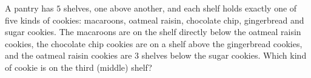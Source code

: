 A pantry has $5$ shelves, one above another, and each shelf holds exactly one of five kinds of cookies: macaroons, oatmeal raisin, chocolate chip, gingerbread and sugar cookies. The macaroons are on the shelf directly below the oatmeal raisin cookies, the chocolate chip cookies are on a shelf above the gingerbread cookies, and the oatmeal raisin cookies are $3$ shelves below the sugar cookies. Which kind of cookie is on the third (middle) shelf?
